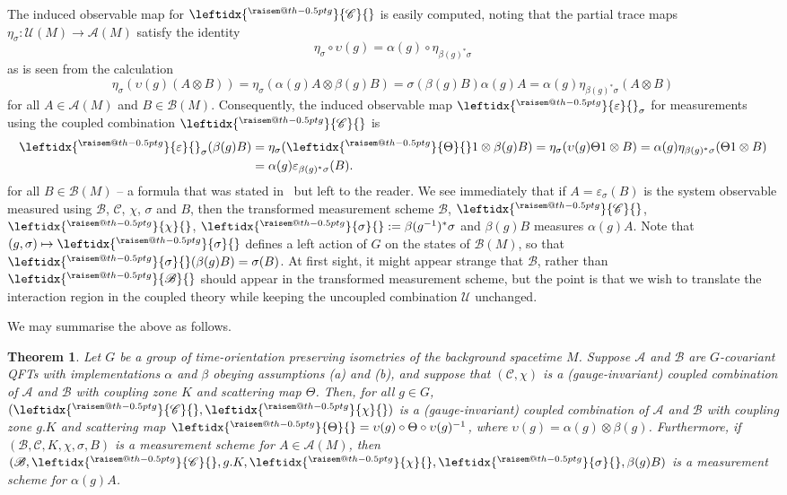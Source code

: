 \documentclass[sn-mathphys-num]{sn-jnl}%
\makeatletter
\newcommand{\raisemath}[1]{\mathpalette{\raisem@th{#1}}}
\newcommand{\raisem@th}[3]{\raisebox{#1}{$#2#3$}}
\newcommand{\act}[2]{\leftidx{^{\raisemath{-0.5pt}{#1}}}{#2}{}}
\newcommand{\Af}{\mathscr{A}}
\newcommand{\Bf}{\mathscr{B}}
\newcommand{\Cf}{\mathscr{C}}
\newcommand{\Uf}{\mathscr{U}}
\numberwithin{equation}{section}
\theoremstyle{thmstyleone}%
\newtheorem{theorem}{Theorem}[section]%
\theoremstyle{thmstyletwo}%
\theoremstyle{thmstylethree}%
\makeatother
\begin{document}
The induced observable map for $\act{g}{\Cf}$ is easily computed, noting that
the partial trace maps $\eta_\sigma:\Uf(M)\to\Af(M)$ satisfy
the identity 
\begin{equation}
    \eta_\sigma\circ\upsilon(g) = \alpha(g)\circ \eta_{\beta(g)^*\sigma}
\end{equation}
as is seen from the calculation
\begin{equation}
    \eta_\sigma(\upsilon(g) (A\otimes B)) = \eta_\sigma(\alpha(g)A\otimes\beta(g)B) = \sigma(\beta(g)B)\alpha(g)A = \alpha(g)\eta_{\beta(g)^*\sigma} (A\otimes B)
\end{equation}
for all $A\in\Af(M)$ and $B\in\Bf(M)$. Consequently, the induced observable map $\act{g}{\varepsilon}_\sigma$ for measurements using the coupled combination $\act{g}{\Cf}$ is
\begin{align}
\act{g}{\varepsilon}_\sigma (\beta(g)B) &= 
\eta_\sigma(\act{g}{\Theta} 1\otimes \beta(g)B) = 
\eta_\sigma(\upsilon(g) \Theta 1\otimes B) = 
\alpha(g) \eta_{\beta(g)^*\sigma}(\Theta 1\otimes B) \nonumber \\&= 
\alpha(g) \varepsilon_{\beta(g)^*\sigma}(B).
\end{align}
for all $B\in\Bf(M)$ -- a formula that was stated in~\cite{FewVer_QFLM:2018} but left to the reader.
We see immediately that if $A=\varepsilon_\sigma(B)$
is the system observable measured using $\Bf$, $\Cf$, $\chi$, $\sigma$ and $B$, then the transformed measurement scheme $\Bf$, $\act{g}{\Cf}$, $\act{g}{\chi}$, $\act{g}{\sigma}:=\beta(g^{-1})^*\sigma$ and $\beta(g)B$ measures $\alpha(g)A$. 
Note that $(g,\sigma)\mapsto \act{g}{\sigma}$ defines a left action of $G$ on the states of $\Bf(M)$, so that $\act{g}{\sigma}(\beta(g)B)=\sigma(B)$. At first sight, it might appear strange that $\Bf$, rather than $\act{g}{\Bf}$ should appear in the transformed measurement scheme, but the point is that we wish to translate the interaction region in the coupled theory while keeping the uncoupled combination $\Uf$ unchanged.

We may summarise the above as follows.
\begin{theorem} 
\label{thm:measurement_cov}
Let $G$ be a group of time-orientation preserving isometries of the background spacetime $M$.
Suppose $\Af$ and $\Bf$ are $G$-covariant QFTs with implementations $\alpha$ and $\beta$
obeying assumptions (a) and (b), and suppose that $(\Cf,\chi)$ is a (gauge-invariant) coupled combination of $\Af$ and $\Bf$ with coupling zone $K$ and scattering map $\Theta$. Then, for all $g\in G$,  $(\act{g}{\Cf},\act{g}{\chi})$ is a (gauge-invariant) coupled combination of $\Af$ and $\Bf$ with coupling zone $g.K$ and scattering map $\act{g}{\Theta} = \upsilon(g) \circ\Theta \circ\upsilon(g)^{-1}$, where $\upsilon(g) = \alpha(g)\otimes\beta(g)$. Furthermore, if $(\Bf,\Cf,K,\chi,\sigma, B)$ is a measurement scheme for 
$A\in\Af(M)$, then $(\Bf, \act{g}{\Cf},g.K, \act{g}{\chi}, \act{g}{\sigma},\beta(g)B)$ is a measurement scheme for $\alpha(g)A$. 
\end{theorem} 
\end{document}
